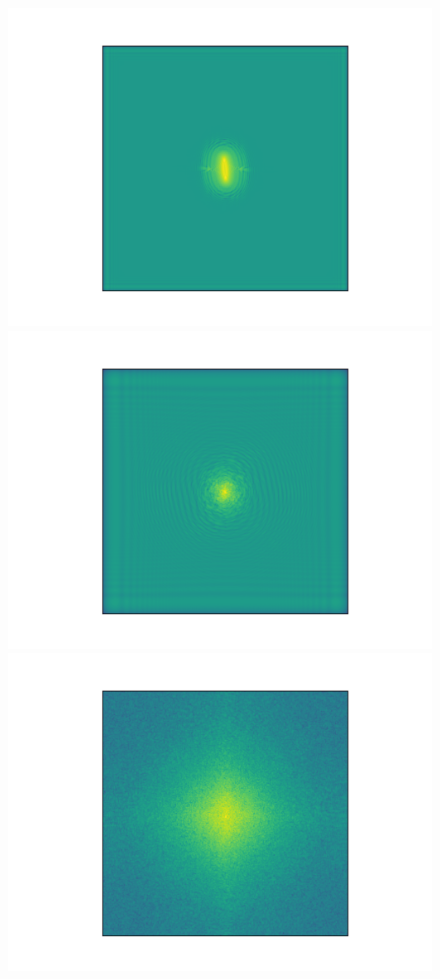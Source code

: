 \documentclass[a4paper,11pt]{article}
\begin{document}
\begin{figure}[!htb]
  \includegraphics[trim={3cm 0 0 0},scale=0.5]{single_mid_plane_1.png}
\endminipage\hfill
{}
  \includegraphics[trim={3cm 0 0 0},scale=0.5]{single_mid_plane_7.png}
\endminipage\hfill
{}%
  \includegraphics[trim={3cm 0 0 0},scale=0.5]{single_mid_plane_107.png}

\end{figure}
\end{document}
